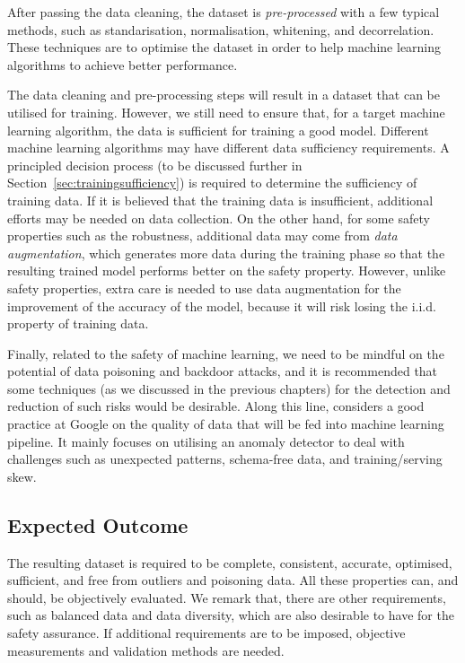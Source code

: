 After passing the data cleaning, the dataset is \emph{pre-processed} with  a few typical methods, such as standarisation, normalisation,  whitening, and decorrelation. These techniques are to optimise the dataset in order to help machine learning algorithms to achieve better performance. 
%

The data cleaning and pre-processing steps will result in a dataset that can be utilised for training. However, we still need to ensure that, for a  target machine learning algorithm, the data is sufficient for training a good model. Different machine learning algorithms may have different data sufficiency requirements. A principled decision process (to be discussed further in Section~\ref{sec:trainingsufficiency}) is required to determine the sufficiency of training data. If it is believed that the training data is insufficient, additional efforts may be needed on data collection. On the other hand, for some safety properties such as the robustness, additional data may come from  \emph{data augmentation}, which generates more data during the training phase so that the resulting trained model performs better on the safety property. However, unlike safety properties, extra care is needed to use data augmentation for the improvement of the accuracy of the model, because it will risk losing the i.i.d. property of training data. 

Finally, related to the safety of machine learning, we need to be mindful on the potential of data poisoning and backdoor attacks, and it is recommended that some techniques (as we discussed in the previous chapters) for the detection and reduction of such risks would be desirable.  Along this line, \cite{DBLP:conf/mlsys/BreckP0WZ19} considers a good practice at Google on the quality of data that will be fed into machine learning pipeline. It mainly focuses on utilising an anomaly detector to deal with challenges such as unexpected patterns, schema-free data, and training/serving skew. 

\subsection*{Expected Outcome}

The resulting dataset is required to be complete, consistent, accurate, optimised, sufficient, and free from outliers and poisoning data. All these properties can, and should, be objectively evaluated. We remark that, there are other requirements, such as balanced data and data diversity, which are also desirable to have 
for the safety assurance. If additional requirements are to be imposed, objective measurements and validation methods are needed. 